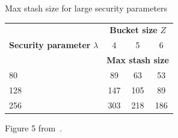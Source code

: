 \begin{frame}{Max stash size for large security parameters}
	
	\begin{center}

		\begin{tabular}{ l c c c }

			\toprule%

			\multirow{3}{*}{\textbf{Security parameter} $\lambda$}	& \multicolumn{3}{c}{\textbf{Bucket size} $Z$}					\\
																	& 4												& 5		& 6		\\
																	& \multicolumn{3}{c}{\textbf{Max stash size}}					\\

			\midrule%

			80														& 89											& 63	& 53	\\
			128														& 147											& 105	& 89	\\
			256														& 303											& 218	& 186	\\

			\bottomrule%

		\end{tabular}

	\end{center}

	Figure 5 from~\cite{DBLP:journals/corr/abs-1202-5150}.

\end{frame}

